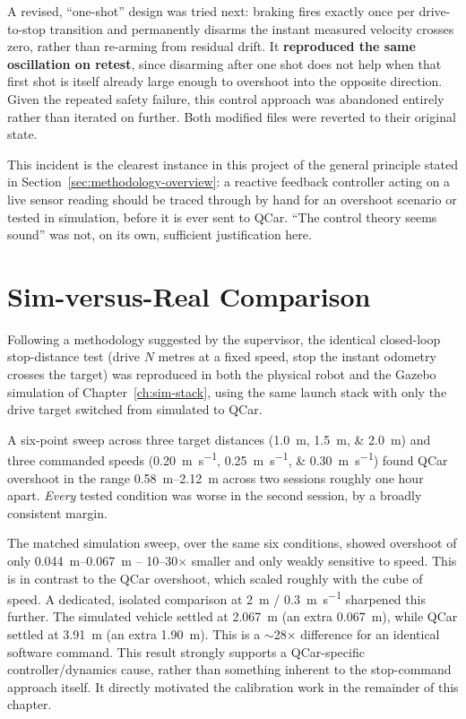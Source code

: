 A revised, ``one-shot'' design was tried next: braking fires exactly
once per drive-to-stop transition and permanently disarms the
instant measured velocity crosses zero, rather than re-arming from
residual drift. It \textbf{reproduced the same oscillation on
retest}, since disarming after one shot does not help when that
first shot is itself already large enough to overshoot into the
opposite direction. Given the repeated safety failure, this control
approach was abandoned entirely rather than iterated on further.
Both modified files were reverted to their original state.

This incident is the clearest instance in this project of the general
principle stated in Section~\ref{sec:methodology-overview}: a
reactive feedback controller acting on a live sensor reading should
be traced through by hand for an overshoot scenario or tested in
simulation, before it is ever sent to QCar. ``The
control theory seems sound'' was not, on its own, sufficient
justification here.

\section{Sim-versus-Real Comparison}
\label{sec:sim-vs-real}

Following a methodology suggested by the supervisor, the
identical closed-loop stop-distance test (drive $N$
metres at a fixed speed, stop the instant odometry crosses the
target) was reproduced in both the physical robot and the Gazebo
simulation of Chapter~\ref{ch:sim-stack}, using the same launch stack
with only the drive target switched from simulated to QCar.

A six-point sweep across three target distances
(\SIlist{1.0;1.5;2.0}{\meter}) and three commanded speeds
(\SIlist{0.20;0.25;0.30}{\meter\per\second}) found QCar
overshoot in the range \SIrange{0.58}{2.12}{\meter} across
two sessions roughly one hour apart. \emph{Every} tested condition
was worse in the second session, by a broadly consistent margin.

The matched simulation sweep, over the same six conditions, showed
overshoot of only \SIrange{0.044}{0.067}{\meter} --
\SIrange{10}{30}{}$\times$ smaller and only weakly sensitive to
speed. This is in contrast to the QCar overshoot, which
scaled roughly with the cube of speed. A dedicated, isolated
comparison at \SI{2}{\meter} / \SI{0.3}{\meter\per\second} sharpened
this further. The simulated vehicle settled at \SI{2.067}{\meter}
(an extra \SI{0.067}{\meter}), while QCar settled at
\SI{3.91}{\meter} (an extra \SI{1.90}{\meter}). This is a
$\sim$28$\times$ difference for an identical software command. This
result strongly supports a QCar-specific controller/dynamics
cause, rather than something inherent to the stop-command approach
itself. It directly motivated the calibration work in the remainder
of this chapter.

